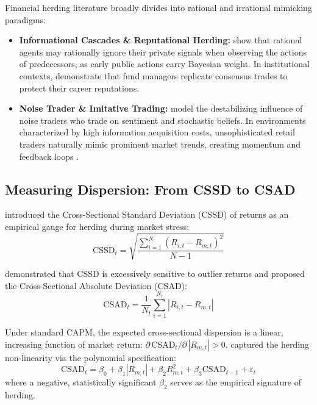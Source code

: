 \documentclass[12pt, a4paper]{article}
\begin{document}
Financial herding literature broadly divides into rational and irrational mimicking paradigms:
\begin{itemize}
  \item \textbf{Informational Cascades \& Reputational Herding:} \citet{Bikhchandani1992} show that rational agents may rationally ignore their private signals when observing the actions of predecessors, as early public actions carry Bayesian weight. In institutional contexts, \citet{Scharfstein1990} demonstrate that fund managers replicate consensus trades to protect their career reputations.
  \item \textbf{Noise Trader \& Imitative Trading:} \citet{DeLong1990} model the destabilizing influence of noise traders who trade on sentiment and stochastic beliefs. In environments characterized by high information acquisition costs, unsophisticated retail traders naturally mimic prominent market trends, creating momentum and feedback loops \citep{Grossman1980}.
\end{itemize}

\subsection{Measuring Dispersion: From CSSD to CSAD}

\citet{Christie1995} introduced the Cross-Sectional Standard Deviation (CSSD) of returns as an empirical gauge for herding during market stress:
\begin{equation}
  \mathrm{CSSD}_t = \sqrt{\frac{\sum_{i=1}^N \left(R_{i,t} - R_{m,t}\right)^2}{N - 1}}
\end{equation}

\citet{Chang2000} demonstrated that CSSD is excessively sensitive to outlier returns and proposed the Cross-Sectional Absolute Deviation (CSAD):
\begin{equation}
  \mathrm{CSAD}_t = \frac{1}{N_t} \sum_{i=1}^{N_t} \left|R_{i,t} - R_{m,t}\right|
\end{equation}

Under standard CAPM, the expected cross-sectional dispersion is a linear, increasing function of market return: $\partial\,\mathrm{CSAD}_t / \partial\,|R_{m,t}| > 0$. \citet{Chang2000} captured the herding non-linearity via the polynomial specification:
\begin{equation}
  \label{eq:chang}
  \mathrm{CSAD}_t = \beta_0 + \beta_1 |R_{m,t}| + \beta_2 R_{m,t}^2 + \beta_3 \mathrm{CSAD}_{t-1} + \varepsilon_t
\end{equation}
where a negative, statistically significant $\beta_2$ serves as the empirical signature of herding.
\end{document}
